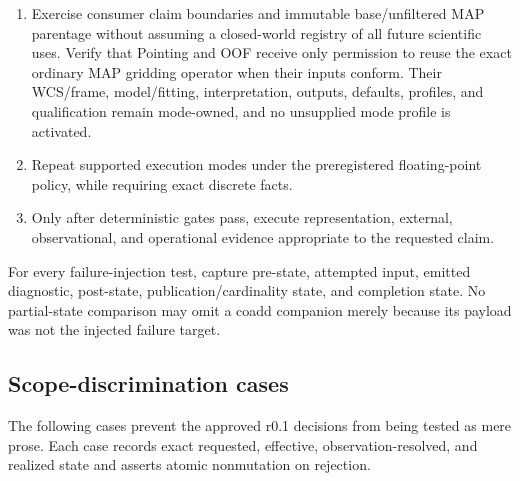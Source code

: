 \documentclass[10pt]{article}
\begin{document}
\begin{enumerate}
\item Exercise consumer claim boundaries and immutable base/unfiltered MAP
parentage without assuming a closed-world registry of all future scientific
uses.  Verify that Pointing and OOF receive only permission to reuse the exact
ordinary MAP gridding operator when their inputs conform.  Their WCS/frame,
model/fitting, interpretation, outputs, defaults, profiles, and qualification
remain mode-owned, and no unsupplied mode profile is activated.
\item Repeat supported execution modes under the preregistered floating-point
policy, while requiring exact discrete facts.
\item Only after deterministic gates pass, execute representation, external,
observational, and operational evidence appropriate to the requested claim.
\end{enumerate}

For every failure-injection test, capture pre-state, attempted input, emitted
diagnostic, post-state, publication/cardinality state, and completion state.
No partial-state comparison may omit a coadd companion merely because its
payload was not the injected failure target.

\subsection{Scope-discrimination cases}

The following cases prevent the approved r0.1 decisions from being tested as
mere prose.  Each case records exact requested, effective,
observation-resolved, and realized state and asserts atomic nonmutation on
rejection.
\end{document}
